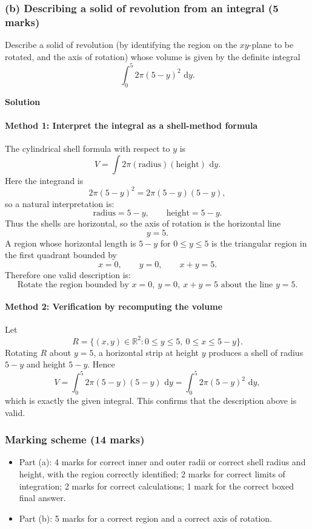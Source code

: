 \documentclass[12pt]{article}
\newcommand{\dd}{\,\mathrm{d}}
\newcommand{\R}{\mathbb{R}}
\begin{document}
\subsubsection{(b) Describing a solid of revolution from an integral \hfill (5 marks)}

Describe a solid of revolution (by identifying the region on the \(xy\)-plane to be rotated, and the axis of rotation) whose volume is given by the definite integral
\[
\int_{0}^{5} 2\pi(5-y)^2\,\dd y.
\]

\textbf{Solution}

\paragraph{Method 1: Interpret the integral as a shell-method formula}
The cylindrical shell formula with respect to \(y\) is
\[
V=\int 2\pi(\text{radius})(\text{height})\,\dd y.
\]
Here the integrand is
\[
2\pi(5-y)^2=2\pi(5-y)(5-y),
\]
so a natural interpretation is:
\[
\text{radius}=5-y,
\qquad
\text{height}=5-y.
\]
Thus the shells are horizontal, so the axis of rotation is the horizontal line
\[
y=5.
\]
A region whose horizontal length is \(5-y\) for \(0\le y\le 5\) is the triangular region in the first quadrant bounded by
\[
x=0, \qquad y=0, \qquad x+y=5.
\]
Therefore one valid description is:
\[
\boxed{\text{Rotate the region bounded by }x=0,\ y=0,\ x+y=5\text{ about the line }y=5.}
\]

\paragraph{Method 2: Verification by recomputing the volume}
Let
\[
R=\{(x,y)\in\R^2:0\le y\le 5,\ 0\le x\le 5-y\}.
\]
Rotating \(R\) about \(y=5\), a horizontal strip at height \(y\) produces a shell of radius \(5-y\) and height \(5-y\). Hence
\[
V=\int_{0}^{5}2\pi(5-y)(5-y)\,\dd y
=\int_{0}^{5}2\pi(5-y)^2\,\dd y,
\]
which is exactly the given integral. This confirms that the description above is valid.

\subsubsection{Marking scheme \hfill (14 marks)}
\begin{itemize}
  \item Part (a): 4 marks for correct inner and outer radii or correct shell radius and height, with the region correctly identified; 2 marks for correct limits of integration; 2 marks for correct calculations; 1 mark for the correct boxed final answer.
  \item Part (b): 5 marks for a correct region and a correct axis of rotation.
\end{itemize}
\end{document}
